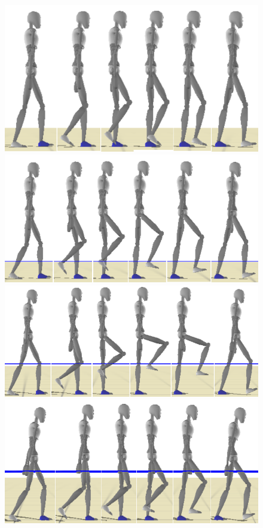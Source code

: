 \documentclass[runningheads,a4paper]{llncs}
\begin{document}
\begin{figure}[!h]
\centering
\includegraphics[scale=0.3]{strips/3_6_1_0cm.png}
\includegraphics[scale=0.3]{strips/3_6_1_25cm.png}
\includegraphics[scale=0.3]{strips/3_6_1_50cm.png}
\includegraphics[scale=0.3]{strips/3_6_1_75cm.png}

\end{figure}
\end{document}
